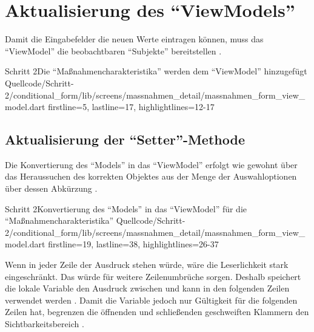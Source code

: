 
\clearpage
\section{Aktualisierung des \enquote{ViewModels}}

Damit die Eingabefelder die neuen Werte eintragen können,
muss das \enquote{ViewModel} die beobachtbaren \enquote{Subjekte} bereitstellen .

\begin{alexlisting}{Schritt 2}{Die \enquote{Maßnahmencharakteristika} werden dem \enquote{ViewModel} hinzugefügt}
  {Quellcode/Schritt-2/conditional_form/lib/screens/massnahmen_detail/massnahmen_form_view_model.dart}
  {firstline=5, lastline=17, highlightlines={12-17}}
  \label{lst:Schritt2MassnahmencharakteristikaWerdenDemViewModelHinzugefuegt}
\end{alexlisting}

\subsection{Aktualisierung der \enquote{Setter}-Methode}

Die Konvertierung des \enquote{Models} in das \enquote{ViewModel} erfolgt wie gewohnt
über das Heraussuchen des korrekten Objektes aus der Menge der Auswahloptionen
über dessen Abkürzung .

\begin{alexlisting}{Schritt 2}{Konvertierung des \enquote{Models} in das \enquote{ViewModel} für die \enquote{Maßnahmencharakteristika}}
  {Quellcode/Schritt-2/conditional_form/lib/screens/massnahmen_detail/massnahmen_form_view_model.dart}
  {firstline=19, lastline=38, highlightlines={26-37}}
  \label{lst:Schritt2KonvertierungDesModelsInDasViewModel}
\end{alexlisting}

Wenn in jeder Zeile der Ausdruck  stehen würde, wäre die Leserlichkeit stark eingeschränkt.
Das würde für weitere Zeilenumbrüche sorgen.
Deshalb speichert die lokale Variable  den Ausdruck zwischen und kann in den folgenden Zeilen verwendet werden .
Damit die Variable  jedoch nur Gültigkeit für die folgenden Zeilen hat, begrenzen die öffnenden und schließenden geschweiften Klammern den Sichtbarkeitsbereich .

